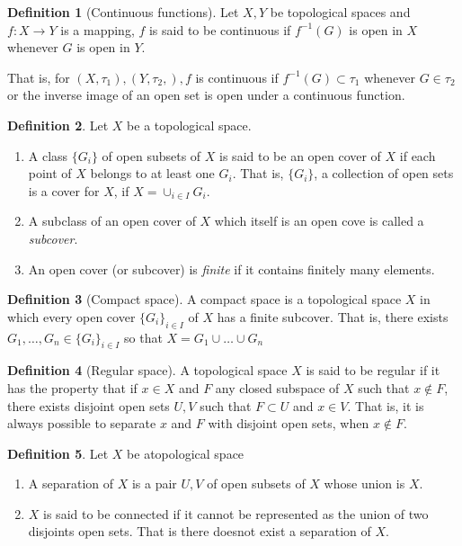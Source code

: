 \documentclass[a4paper, 12pt]{scrbook}
\theoremstyle{definition}
\newtheorem{defn}{Definition}[section]
\newcommand{\lra}{\longrightarrow}
\newcommand{\disp}{\displaystyle}
\begin{document}
    \begin{defn}[Continuous functions]
        Let $X,Y$ be topological spaces and \\
        $\disp f: X \lra Y$ is a mapping, $f$ is said to be continuous if $\disp f^{-1}(G)$ is open in $X$ whenever $G$ is open in $Y$.

        That is, for $(X, \tau_1),(Y, \tau_2,), f$ is continuous if $f^{-1} (G) \subset \tau_1$ whenever $G \in \tau_2$ or the inverse image of an open set is open under a continuous function.
    \end{defn}

    \begin{defn} 
        Let $X$ be a topological space.
        \begin{enumerate}
            \item A class $\{G_i\}$ of open subsets of $X$ is said to be an open cover of $X$ if each point of $X$ belongs to at least one $G_i$. That is, $\{G_i\}$, a collection of open sets is a cover for $X$, if $X = \cup_{i \in I} G_i$.
            \item A subclass of an open cover of $X$ which itself is an open cove is called a \textit{subcover}.
            \item An open cover (or subcover) is \textit{finite} if it contains finitely many elements. 
        \end{enumerate}
    \end{defn}

    \begin{defn}[Compact space]
        A compact space is a topological space $X$ in which every open cover $\{G_i\}_{i \in I}$ of $X$ has a finite subcover. That is, there exists $G_1, \ldots, G_n \in \{G_i\}_{i \in I}$ so that $X  = G_1 \cup \ldots \cup G_n$ 
    \end{defn}

    \begin{defn}[Regular space]
        A topological space $X$ is said to be regular if it has the property that if $x \in X$ and $F$ any closed subspace of $X$ such that $x \notin F$, there exists disjoint open sets $U,V$ such that $F \subset U$ and $x \in V$. That is, it is always possible to separate $x$ and $F$ with disjoint open sets, when $x \notin F$.
    \end{defn}

    \begin{defn}
        Let $X$ be atopological space 
        \begin{enumerate}
            \item A separation of $X$ is a pair $U,V$ of open subsets of $X$ whose union is $X$.
            \item $X$ is said to be connected if it cannot be represented as the union of two disjoints open sets. That is there doesnot exist a separation of $X$.
        \end{enumerate}
    \end{defn}
    
\end{document}
